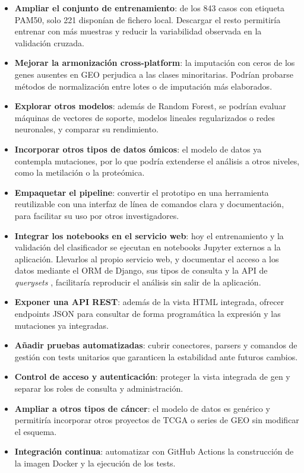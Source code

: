 \documentclass[12pt, a4paper]{report}
\begin{document}
\begin{itemize}
  \item \textbf{Ampliar el conjunto de entrenamiento}: de los 843 casos con etiqueta PAM50, solo 221 disponían de fichero local. Descargar el resto permitiría entrenar con más muestras y reducir la variabilidad observada en la validación cruzada.
  \item \textbf{Mejorar la armonización cross-platform}: la imputación con ceros de los genes ausentes en GEO perjudica a las clases minoritarias. Podrían probarse métodos de normalización entre lotes o de imputación más elaborados.
  \item \textbf{Explorar otros modelos}: además de Random Forest, se podrían evaluar máquinas de vectores de soporte, modelos lineales regularizados o redes neuronales, y comparar su rendimiento.
  \item \textbf{Incorporar otros tipos de datos ómicos}: el modelo de datos ya contempla mutaciones, por lo que podría extenderse el análisis a otros niveles, como la metilación o la proteómica.
  \item \textbf{Empaquetar el pipeline}: convertir el prototipo en una herramienta reutilizable con una interfaz de línea de comandos clara y documentación, para facilitar su uso por otros investigadores.
  \item \textbf{Integrar los notebooks en el servicio web}: hoy el entrenamiento y la validación del clasificador se ejecutan en notebooks Jupyter externos a la aplicación. Llevarlos al propio servicio web, y documentar el acceso a los datos mediante el ORM de Django, sus tipos de consulta y la API de \textit{querysets} \cite{noauthor_making_nodate}, facilitaría reproducir el análisis sin salir de la aplicación.
  \item \textbf{Exponer una API REST}: además de la vista HTML integrada, ofrecer endpoints JSON para consultar de forma programática la expresión y las mutaciones ya integradas.
  \item \textbf{Añadir pruebas automatizadas}: cubrir conectores, parsers y comandos de gestión con tests unitarios que garanticen la estabilidad ante futuros cambios.
  \item \textbf{Control de acceso y autenticación}: proteger la vista integrada de gen y separar los roles de consulta y administración.
  \item \textbf{Ampliar a otros tipos de cáncer}: el modelo de datos es genérico y permitiría incorporar otros proyectos de TCGA o series de GEO sin modificar el esquema.
  \item \textbf{Integración continua}: automatizar con GitHub Actions la construcción de la imagen Docker y la ejecución de los tests.
\end{itemize}
\end{document}

